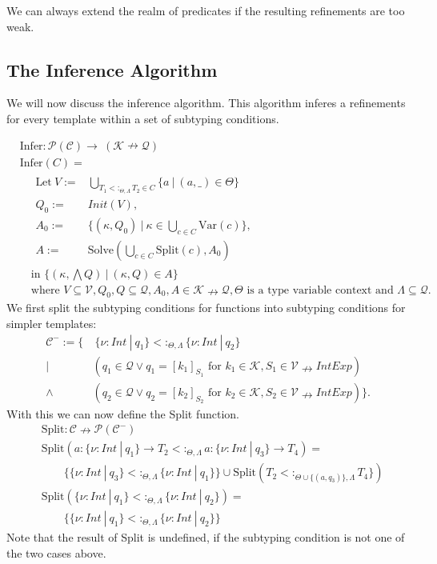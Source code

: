 \documentclass[]{scrbook}
\theoremstyle{definition}
\theoremstyle{definition}
\theoremstyle{definition}
\theoremstyle{remark}
\begin{document}
We can always extend the realm of predicates if the resulting
refinements are too weak.

\subsection{The Inference Algorithm}\label{the-inference-algorithm}

We will now discuss the inference algorithm. This algorithm inferes a
refinements for every template within a set of subtyping conditions.

\[
\begin{aligned}
&\text{Infer}:\mathcal{P}(\mathcal{C})\to\ (\mathcal{K}\nrightarrow \mathcal{Q})\\
&\text{Infer}(C)=\\
&\quad\begin{aligned}\text{Let}\
V:=&\bigcup_{T_1<:_{\Theta,\Lambda}T_2\in C}\{a \ | \ (a,\_)\in\Theta\}\\
Q_0:=&\mathit{Init}(V),\\
A_0:=&\{(\kappa,Q_0)\ | \ \kappa\in\bigcup_{c\in C}\text{Var}(c)\},\\
A:=&\text{Solve}(\bigcup_{c\in C} \text{Split}(c),A_0)\end{aligned}\\
&\quad\text{in } \{(\kappa,\bigwedge Q) \ | \ (\kappa,Q)\in A\}\\
&\quad\text{where } V\subseteq\mathcal{V},Q_0,Q\subseteq\mathcal{Q}, A_0,A\in\mathcal{K}\nrightarrow\mathcal{Q}, \Theta\text{ is a type variable context and } \Lambda\subseteq\mathcal{Q}.
\end{aligned}
\] We first split the subtyping conditions for functions into subtyping
conditions for simpler templates: \[
\begin{aligned}
\mathcal{C}^-:=\{&\ \{\nu:\mathit{Int}\ |\ q_1\}<:_{\Theta,\Lambda}\{\nu:\mathit{Int}\ |\ q_2\}\\
| \ &(q_1\in\mathcal{Q}\lor q_1=[k_1]_{S_1} \text{ for } k_1\in\mathcal{K}, S_1\in\mathcal{V}\nrightarrow\mathit{IntExp})\\
\land\ &(q_2\in\mathcal{Q}\lor q_2=[k_2]_{S_2} \text{ for } k_2\in\mathcal{K}, S_2\in\mathcal{V}\nrightarrow\mathit{IntExp})\}.
\end{aligned}
\] With this we can now define the Split function. \[
\begin{aligned}
&\text{Split}:\mathcal{C}\nrightarrow\mathcal{P}(\mathcal{C^-})\\
&\text{Split}(a:\{\nu:\mathit{Int}\ |\ q_1\}\to T_2<:_{\Theta,\Lambda}a:\{\nu:\mathit{Int}\ |\ q_3\}\to T_4 )=\\
&\quad\quad\{\{\nu:\mathit{Int}\ |\ q_3\} <:_{\Theta,\Lambda}\{\nu:\mathit{Int}\ |\ q_1\}\}\cup\text{Split}(T_2 <:_{\Theta\cup\{(a,q_3)\},\Lambda}T_4\})\\
&\text{Split}(\{\nu:\mathit{Int}\ |\ q_1\}<:_{\Theta,\Lambda}\{\nu:\mathit{Int}\ |\ q_2\} )=\\
&\quad\quad\{ \{\nu:\mathit{Int}\ |\ q_1\}<:_{\Theta,\Lambda}\{\nu:\mathit{Int}\ |\ q_2\} \}
\end{aligned}
\] Note that the result of Split is undefined, if the subtyping
condition is not one of the two cases above.
\end{document}
